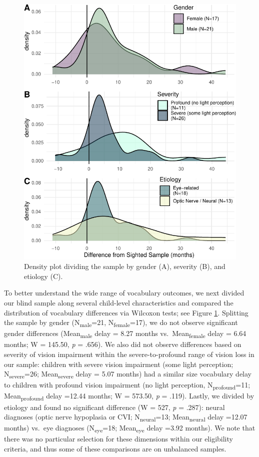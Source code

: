\documentclass[english,man,floatsintext]{apa6}
\begin{document}
\begin{figure}
\centering
\includegraphics{VI_CDI_manuscript_files/figure-latex/splitting-tests-1.pdf}
\caption{\label{fig:splitting-tests}Density plot dividing the sample by gender (A), severity (B), and etiology (C).}
\end{figure}

To better understand the wide range of vocabulary outcomes, we next divided our blind sample along several child-level characteristics and compared the distribution of vocabulary differences via Wilcoxon tests; see Figure \ref{fig:splitting-tests}. Splitting the sample by gender (N\textsubscript{male}=21, N\textsubscript{female}=17), we do not observe significant gender differences (Mean\textsubscript{male} delay = 8.27 months vs.~Mean\textsubscript{female} delay = 6.64 months; W = 145.50, \emph{p} = .656). We also did not observe differences based on severity of vision impairment within the severe-to-profound range of vision loss in our sample: children with severe vision impairment (some light perception; N\textsubscript{severe}=26; Mean\textsubscript{severe} delay = 5.07 months) had a similar size vocabulary delay to children with profound vision impairment (no light perception, N\textsubscript{profound}=11; Mean\textsubscript{profound} delay =12.44 months; W = 573.50, \emph{p} = .119). Lastly, we divided by etiology and found no significant difference (W = 527, \emph{p} = .287): neural diagnoses (optic nerve hypoplasia or CVI; N\textsubscript{neural}=13; Mean\textsubscript{neural} delay =12.07 months) vs.~eye diagnoses (N\textsubscript{eye}=18; Mean\textsubscript{eye} delay =3.92 months). We note that there was no particular selection for these dimensions within our eligibility criteria, and thus some of these comparisons are on unbalanced samples.
\end{document}
